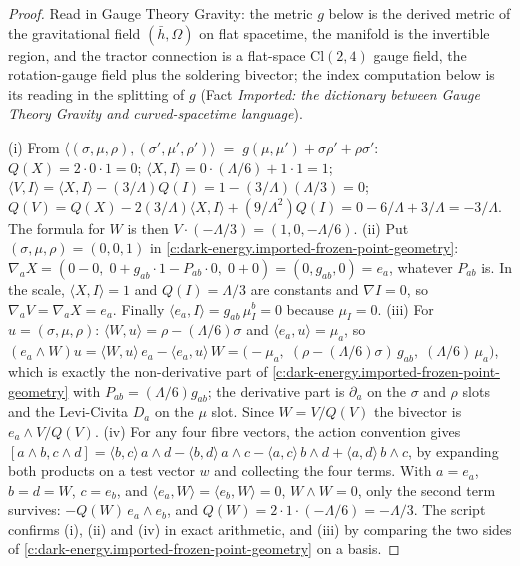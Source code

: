 \documentclass[11pt]{article}
\theoremstyle{definition}
\theoremstyle{plain}
\providecommand{\Cl}{}\renewcommand{\Cl}{\mathrm{Cl}}
\providecommand{\hb}{}\renewcommand{\hb}{\bar{h}}
\providecommand{\ip}{}\renewcommand{\ip}[2]{\langle #1, #2\rangle}
\begin{document}
\begin{proof}
Read in Gauge Theory Gravity: the metric $g$ below is the derived metric of the gravitational field $(\hb, \Omega)$ on flat spacetime, the manifold is the invertible region, and the tractor connection is a flat-space $\Cl(2,4)$ gauge field, the rotation-gauge field plus the soldering bivector; the index computation below is its reading in the splitting of $g$ (Fact \emph{Imported: the dictionary between Gauge Theory Gravity and curved-spacetime language}).

(i) From $\ip{(\sigma,\mu,\rho)}{(\sigma',\mu',\rho')} \;=\; g(\mu,\mu') + \sigma\rho' + \rho\sigma'$: $Q(X) = 2\cdot 0\cdot 1 = 0$; $\ip{X}{I} = 0\cdot(\Lambda/6) + 1\cdot 1 = 1$; $\ip{V}{I} = \ip{X}{I} - (3/\Lambda)Q(I) = 1 - (3/\Lambda)(\Lambda/3) = 0$; $Q(V) = Q(X) - 2(3/\Lambda)\ip{X}{I} + (9/\Lambda^2)Q(I) = 0 - 6/\Lambda + 3/\Lambda = -3/\Lambda$. The formula for $W$ is then $V\cdot(-\Lambda/3) = (1, 0, -\Lambda/6)$.
(ii) Put $(\sigma,\mu,\rho) = (0,0,1)$ in \ref{c:dark-energy.imported-frozen-point-geometry}: $\nabla_a X = (0 - 0,\; 0 + g_{ab}\cdot 1 - P_{ab}\cdot 0,\; 0 + 0) = (0, g_{ab}, 0) = e_a$, whatever $P_{ab}$ is. In the scale, $\ip{X}{I} = 1$ and $Q(I) = \Lambda/3$ are constants and $\nabla I = 0$, so $\nabla_a V = \nabla_a X = e_a$. Finally $\ip{e_a}{I} = g_{ab}\,\mu_I^b = 0$ because $\mu_I = 0$.
(iii) For $u = (\sigma,\mu,\rho)$: $\ip{W}{u} = \rho - (\Lambda/6)\sigma$ and $\ip{e_a}{u} = \mu_a$, so
$(e_a\wedge W)u = \ip{W}{u}\,e_a - \ip{e_a}{u}\,W = \bigl(-\mu_a,\; (\rho - (\Lambda/6)\sigma)\,g_{ab},\; (\Lambda/6)\,\mu_a\bigr)$,
which is exactly the non-derivative part of \ref{c:dark-energy.imported-frozen-point-geometry} with $P_{ab} = (\Lambda/6)g_{ab}$; the derivative part is $\partial_a$ on the $\sigma$ and $\rho$ slots and the Levi-Civita $D_a$ on the $\mu$ slot. Since $W = V/Q(V)$ the bivector is $e_a\wedge V/Q(V)$.
(iv) For any four fibre vectors, the action convention gives $[a\wedge b, c\wedge d] = \ip{b}{c}\,a\wedge d - \ip{b}{d}\,a\wedge c - \ip{a}{c}\,b\wedge d + \ip{a}{d}\,b\wedge c$, by expanding both products on a test vector $w$ and collecting the four terms. With $a = e_a$, $b = d = W$, $c = e_b$, and $\ip{e_a}{W} = \ip{e_b}{W} = 0$, $W\wedge W = 0$, only the second term survives: $-Q(W)\,e_a\wedge e_b$, and $Q(W) = 2\cdot 1\cdot(-\Lambda/6) = -\Lambda/3$. The script confirms (i), (ii) and (iv) in exact arithmetic, and (iii) by comparing the two sides of \ref{c:dark-energy.imported-frozen-point-geometry} on a basis.

\end{proof}
\end{document}
